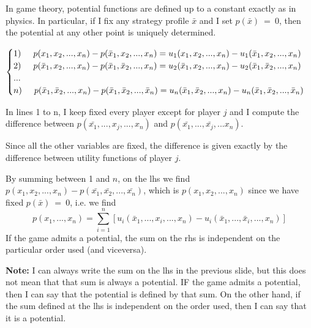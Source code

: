 \noindent In game theory, potential functions are defined up to a constant 
exactly as in physics. In particular, if I fix any strategy profile $\bar{x}$ 
and I set $p(\bar{x})~=~0$, then the potential at any other point is 
uniquely determined.

\begin{equation*}
	\begin{cases}
		1)\hspace{.5cm} p(x_1,x_2,...,x_n) - 
								p(\bar{x}_1,x_2,...,x_n) = 
		    					u_1(x_1,x_2,...,x_n) - 
		    					u_1(\bar{x}_1,x_2,...,x_n)\\
		    
		2)\hspace{.5cm} p(\bar{x}_1,x_2,...,x_n) -
								p(\bar{x}_1,\bar{x}_2,...,x_n) = 
								u_2(\bar{x}_1,x_2,...,x_n) -
								u_2(\bar{x}_1,\bar{x}_2,...,x_n)\\	
			
		...\\
		
		n)\hspace{.5cm} p(\bar{x}_1,\bar{x}_2,...,x_n) -
								p(\bar{x}_1,\bar{x}_2,...,\bar{x}_n) = 
								u_n(\bar{x}_1,\bar{x}_2,...,x_n) -
								u_n(\bar{x}_1,\bar{x}_2,...,\bar{x}_n)\\					    
	\end{cases}
\end{equation*}

\noindent In lines 1 to n, I keep fixed every player except for player $j$ 
and I compute the difference between $p(\bar{x_1},...,x_j,...,x_n)$ and 
$p(\bar{x_1},...,\bar{x_j},...x_n)$.

\noindent Since all the other variables are fixed, the difference is given 
exactly by the difference between utility functions of player $j$.

\noindent By summing between 1 and $n$, on the lhs we find 
$p(x_1,x_2,...,x_n)-p(\bar{x_1},\bar{x_2},...,\bar{x_n})$, which is 
$p(x_1,x_2,...,x_n)$ since we have fixed $p(\bar{x})~=~0$, i.e. we find
\[
	p(x_1,...,x_n) = \sum_{i=1}^{n}{[u_i(\bar{x}_1,...,x_i,...,x_n) - 
		u_i(\bar{x}_1,...,\bar{x}_i,...,x_n)]}
\]
If the game admits a potential, the sum on the rhs is independent on the particular order used (and viceversa).

\bigskip
\noindent \textbf{Note:} I can always write the sum on the lhs in the previous slide, but 
this does not mean that that sum is always a potential. IF the game admits 
a potential, then I can say that the potential is defined by that sum. On 
the other hand, if the sum defined at the lhs is independent on the order 
used, then I can say that it is a potential.


